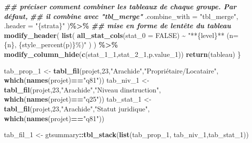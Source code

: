 \documentclass[
]{article}
\newenvironment{Shaded}{\begin{snugshade}}{\end{snugshade}}
\newcommand{\AttributeTok}[1]{\textcolor[rgb]{0.13,0.29,0.53}{#1}}
\newcommand{\ConstantTok}[1]{\textcolor[rgb]{0.56,0.35,0.01}{#1}}
\newcommand{\DecValTok}[1]{\textcolor[rgb]{0.00,0.00,0.81}{#1}}
\newcommand{\DocumentationTok}[1]{\textcolor[rgb]{0.56,0.35,0.01}{\textbf{\textit{#1}}}}
\newcommand{\FunctionTok}[1]{\textcolor[rgb]{0.13,0.29,0.53}{\textbf{#1}}}
\newcommand{\NormalTok}[1]{#1}
\newcommand{\OtherTok}[1]{\textcolor[rgb]{0.56,0.35,0.01}{#1}}
\newcommand{\SpecialCharTok}[1]{\textcolor[rgb]{0.81,0.36,0.00}{\textbf{#1}}}
\newcommand{\StringTok}[1]{\textcolor[rgb]{0.31,0.60,0.02}{#1}}
\begin{document}
\begin{Shaded}
\begin{Highlighting}[]
    \DocumentationTok{\#\# préciser comment combiner les tableaux de chaque groupe. Par défaut, }
    \DocumentationTok{\#\# il combine avec "tbl\_merge"}
    \AttributeTok{.combine\_with =} \StringTok{"tbl\_merge"}\NormalTok{, }
    \AttributeTok{.header =} \StringTok{"\{strata\}"}
\NormalTok{    )}\SpecialCharTok{\%\textgreater{}\%}
    \DocumentationTok{\#\# mise en forme de l\textquotesingle{}entête du tableau}
   \FunctionTok{modify\_header}\NormalTok{(}
      \FunctionTok{list}\NormalTok{(}
        \FunctionTok{all\_stat\_cols}\NormalTok{(}\AttributeTok{stat\_0 =} \ConstantTok{FALSE}\NormalTok{) }\SpecialCharTok{\textasciitilde{}} \StringTok{"**\{level\}** (n=\{n\}, \{style\_percent(p)\}\%)"}
\NormalTok{      )}
\NormalTok{     ) }\SpecialCharTok{\%\textgreater{}\%} 
    \FunctionTok{modify\_column\_hide}\NormalTok{(}\FunctionTok{c}\NormalTok{(stat\_1\_1,stat\_2\_1,p.value\_1))}
  \FunctionTok{return}\NormalTok{(tableau)}
\NormalTok{\}}

\NormalTok{tab\_prop\_1 }\OtherTok{\textless{}{-}} \FunctionTok{tabl\_fil}\NormalTok{(projet,}\DecValTok{23}\NormalTok{,}\StringTok{"Arachide"}\NormalTok{,}\StringTok{"Propriétaire/Locataire"}\NormalTok{,}
                       \FunctionTok{which}\NormalTok{(}\FunctionTok{names}\NormalTok{(projet)}\SpecialCharTok{==}\StringTok{"q81"}\NormalTok{))}
\NormalTok{tab\_niv\_1 }\OtherTok{\textless{}{-}} \FunctionTok{tabl\_fil}\NormalTok{(projet,}\DecValTok{23}\NormalTok{,}\StringTok{"Arachide"}\NormalTok{,}\StringTok{"Niveau d\textquotesingle{}instruction"}\NormalTok{,}
                      \FunctionTok{which}\NormalTok{(}\FunctionTok{names}\NormalTok{(projet)}\SpecialCharTok{==}\StringTok{"q25"}\NormalTok{))}
\NormalTok{tab\_stat\_1 }\OtherTok{\textless{}{-}} \FunctionTok{tabl\_fil}\NormalTok{(projet,}\DecValTok{23}\NormalTok{,}\StringTok{"Arachide"}\NormalTok{,}\StringTok{"Statut juridique"}\NormalTok{,}
                       \FunctionTok{which}\NormalTok{(}\FunctionTok{names}\NormalTok{(projet)}\SpecialCharTok{==}\StringTok{"q81"}\NormalTok{))}

\NormalTok{tab\_fil\_1 }\OtherTok{\textless{}{-}}\NormalTok{ gtsummary}\SpecialCharTok{::}\FunctionTok{tbl\_stack}\NormalTok{(}\FunctionTok{list}\NormalTok{(tab\_prop\_1, tab\_niv\_1,tab\_stat\_1))}



\end{Highlighting}
\end{Shaded}
\end{document}

